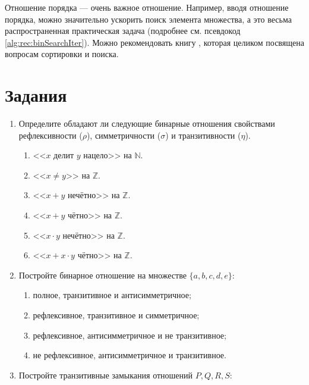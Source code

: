 Отношение порядка --- очень важное отношение. Например, вводя отношение порядка, можно значительно ускорить поиск элемента множества, а это весьма распространенная практическая задача (подробнее см. псевдокод \ref{alg:rec:binSearchIter}). Можно рекомендовать книгу \cite{bib:knuth:artOfProgramming3}, которая целиком посвящена вопросам сортировки и поиска.



\section*{Задания}

\begin{enumerate}

    \item Определите обладают ли следующие бинарные отношения свойствами рефлексивности ($\rho$), симметричности ($\sigma$) и транзитивности ($\eta$).
    \begin{enumerate}
        \item <<$x$ делит $y$ нацело>> на $\mathbb{N}$.
        \item <<$x\neq y$>> на $\mathbb{Z}$.
        \item <<$x+y$ нечётно>> на $\mathbb{Z}$.
        \item <<$x+y$ чётно>> на $\mathbb{Z}$.
        \item <<$x\cdot y$ нечётно>> на $\mathbb{Z}$.
        \item <<$x+x\cdot y$ чётно>> на $\mathbb{Z}$.
    \end{enumerate}

    \item Постройте бинарное отношение на множестве $\{a,b,c,d,e\}$:
    \begin{enumerate}
        \item полное, транзитивное и антисимметричное;
        \item рефлексивное, транзитивное и симметричное;
        \item рефлексивное, антисимметричное и не транзитивное;
        \item не рефлексивное, антисимметричное и транзитивное.
    \end{enumerate}

    \item Постройте транзитивные замыкания отношений $P,Q,R,S$:
    

\end{enumerate}
